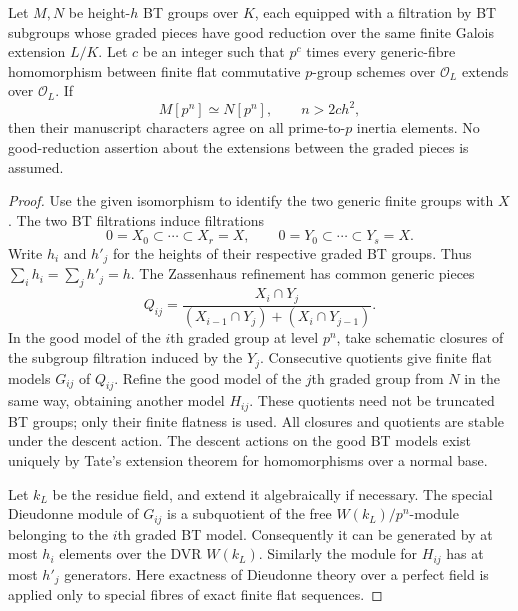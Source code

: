 \begin{lemma}
\label{lem:B-RD17-common}
Let $M,N$ be height-$h$ BT groups over $K$, each equipped with a
filtration by BT subgroups whose graded pieces have good reduction
over the same finite Galois extension $L/K$. Let $c$ be an integer
such that $p^c$ times every generic-fibre homomorphism between finite
flat commutative $p$-group schemes over $\mathcal O_L$ extends over
$\mathcal O_L$. If
\[
 M[p^n]\simeq N[p^n],\qquad n>2ch^2,
                                                        \tag{B-RD17.1}
\]
then their manuscript characters agree on all prime-to-$p$ inertia
elements. No good-reduction assertion about the extensions between
the graded pieces is assumed.
\end{lemma}
\begin{proof}
Use the given isomorphism to identify the two generic finite groups
with $X$. The two BT filtrations induce filtrations
\[
 0=X_0\subset\cdots\subset X_r=X,
 \qquad 0=Y_0\subset\cdots\subset Y_s=X.
\]
Write $h_i$ and $h'_j$ for the heights of their respective graded BT
groups. Thus $\sum_i h_i=\sum_j h'_j=h$.
The Zassenhaus refinement has common generic pieces
\[
 Q_{ij}=
 \frac{X_i\cap Y_j}
 {(X_{i-1}\cap Y_j)+(X_i\cap Y_{j-1})}.
                                                        \tag{B-RD17.2}
\]
In the good model of the $i$th graded group at level $p^n$, take
schematic closures of the subgroup filtration induced by the
$Y_j$. Consecutive quotients give finite flat models $G_{ij}$ of
$Q_{ij}$. Refine the good model of the $j$th graded group from $N$
in the same way, obtaining another model $H_{ij}$. These quotients
need not be truncated BT groups; only their finite flatness is used.
All closures and quotients are stable under the descent action.
The descent actions on the good BT models exist uniquely by Tate's
extension theorem for homomorphisms over a normal base.

Let $k_L$ be the residue field, and extend it algebraically if
necessary. The special Dieudonne module of $G_{ij}$ is a subquotient
of the free $W(k_L)/p^n$-module belonging to the $i$th graded BT
model. Consequently it can be generated by at most $h_i$ elements
over the DVR $W(k_L)$. Similarly the module for $H_{ij}$ has at most
$h'_j$ generators. Here exactness of Dieudonne theory over a perfect
field is applied only to special fibres of exact finite flat
sequences.


\end{proof}
